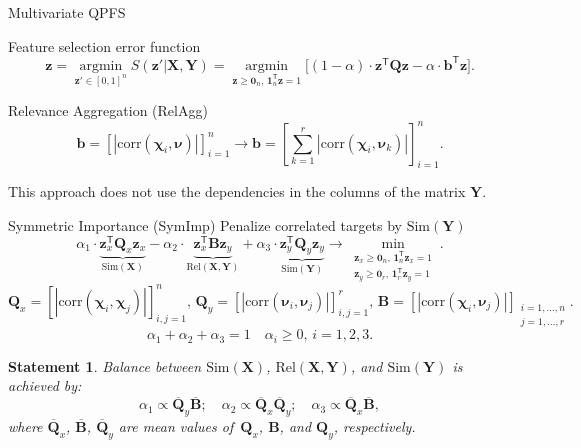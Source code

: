 \documentclass[9pt]{beamer}
\newcommand{\bz}{\mathbf{z}}
\newcommand{\bb}{\mathbf{b}}
\newcommand{\bY}{\mathbf{Y}}
\newcommand{\bX}{\mathbf{X}}
\newcommand{\bB}{\mathbf{B}}
\newcommand{\bQ}{\mathbf{Q}}
\newcommand{\bchi}{\boldsymbol{\chi}}
\newcommand{\bnu}{\boldsymbol{\nu}}
\newcommand{\bOne}{\boldsymbol{1}}
\newcommand{\bZero}{\boldsymbol{0}}
\newcommand{\argmin}{\mathop{\arg \min}\limits}
\newcommand{\T}{\mathsf{T}}
\newtheorem{statement}{Statement}
\begin{document}
\begin{frame}{Multivariate QPFS}
	\begin{block}{Feature selection error function}
	\[
	\bz = \argmin_{\bz' \in [0, 1]^n} S(\bz' | \bX, \bY) = \argmin_{\bz \geq \bZero_n, \, \bOne_n^{\T}\bz=1} \bigl[(1 - \alpha) \cdot \bz^{\T} \bQ \bz - \alpha \cdot \mathbf{b}^{\T} \bz \bigr].
	\]
\end{block}
\begin{block}{Relevance Aggregation (RelAgg)}
\[
\bb = \left[\left|\text{corr}(\bchi_i, \bnu)\right|\right]_{i=1}^n \rightarrow \bb = \left[\sum_{k=1}^r\left|\text{corr}(\bchi_i, \bnu_k)\right|\right]_{i=1}^n.
\]
\end{block}

This approach does not use the dependencies in the columns of the matrix $\bY$. 
\end{frame}
\begin{frame}{Symmetric Importance (SymImp)}
Penalize correlated targets by $\text{Sim} (\bY)$
\[
\alpha_1 \cdot \underbrace{\bz_x^{\T} \bQ_x \bz_x}_{\text{Sim}(\bX)} - \alpha_2 \cdot \underbrace{\bz_x^{\T} \bB \bz_y}_{\text{Rel}(\bX, \bY)} + \alpha_3 \cdot \underbrace{\bz_y^{\T} \bQ_y \bz_y}_{\text{Sim}(\bY)} \rightarrow \min_{\substack{\bz_x \geq \bZero_n, \, \bOne_n^{\T}\bz_x=1 \\ \bz_y \geq \bZero_r, \, \bOne_r^{\T}\bz_y=1}}.
\]
\[
\bQ_x = \left[ \left| \text{corr}(\bchi_i, \bchi_j) \right| \right]_{i,j=1}^n, \,
\bQ_y = \left[ \left| \text{corr}(\bnu_i, \bnu_j) \right| \right]_{i,j=1}^r, \,
\bB =  \left[ \left| \text{corr}(\bchi_i, \bnu_j) \right| \right]_{\substack{i=1, \dots, n \\ j=1, \dots, r}}.
\]
\[
\alpha_1 + \alpha_2 + \alpha_3 = 1 \quad \alpha_i \geq 0, \, i = 1, 2, 3.
\] 

\begin{statement}
	Balance between $\text{Sim}(\bX)$, $\text{Rel}(\bX, \bY)$, and $\text{Sim}(\bY)$ is achieved by:
	\vspace{-0.2cm}
	\[
		\alpha_1 \propto \overline{\bQ}_y \overline{\bB}; \quad
		\alpha_2 \propto \overline{\bQ}_x \overline{\bQ}_y; \quad
		\alpha_3  \propto \overline{\bQ}_x \overline{\bB},
	\]
	where $\overline{\bQ}_x$, $\overline{\bB}$, $\overline{\bQ}_y$ are mean values of~$\bQ_x$, $\bB$, and $\bQ_y$, respectively.
\end{statement}
\end{frame}
\end{document}
